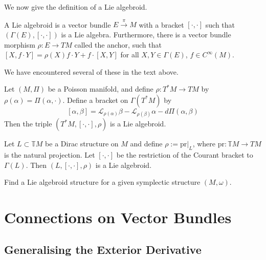We now give the definition of a Lie algebroid.
\begin{definition}
  A Lie algebroid is a vector bundle $E\xrightarrow{\pi}M$ with a bracket $[\cdot,\cdot]$ such that $(\Gamma(E),[\cdot,\cdot])$ is a Lie algebra. Furthermore, there is a vector bundle morphism $\rho:E\to TM$ called the anchor, such that $[X,f\cdot Y]=\rho(X)f\cdot Y+f\cdot[X,Y]$ for all $X,Y\in\Gamma(E)$, $f\in C^\infty(M)$.
\end{definition}
We have encountered several of these in the text above.
\begin{example}
  Let $(M,\Pi)$ be a Poisson manifold, and define $\rho:T^*M\to TM$ by $\rho(\alpha)=\Pi(\alpha,\cdot)$. Define a bracket on $\Gamma(T^*M)$ by $$[\alpha,\beta]=\mathcal{L}_{\rho(\alpha)}\beta-\mathcal{L}_{\rho(\beta)}\alpha-d\Pi(\alpha,\beta)$$
  Then the triple $(T^*M,[\cdot,\cdot],\rho)$ is a Lie algebroid.
\end{example}
\begin{example}
  Let $L\subset\mathbb{T}M$ be a Dirac structure on $M$ and define $\rho:=\text{pr}|_L$, where $\text{pr}:\mathbb{T}M\to TM$ is the natural projection. Let $[\cdot,\cdot]$ be the restriction of the Courant bracket to $\Gamma(L)$. Then $(L,[\cdot,\cdot],\rho)$ is a Lie algebroid.
\end{example}
\begin{exercise}
  Find a Lie algebroid structure for a given symplectic structure $(M,\omega)$.
\end{exercise}

\chapter{Connections on Vector Bundles}

\section{Generalising the Exterior Derivative}

